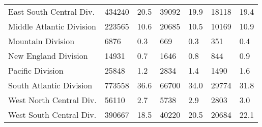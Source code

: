\begin{longtable}{lllllll}
East South Central Div. & 434240 & 20.5 & 39092 & 19.9 & 18118 & 19.4 \\ 
Middle Atlantic Division & 223565 & 10.6 & 20685 & 10.5 & 10169 & 10.9 \\ 
Mountain Division & 6876 & 0.3 & 669 & 0.3 & 351 & 0.4 \\ 
New England Division & 14931 & 0.7 & 1646 & 0.8 & 844 & 0.9 \\ 
Pacific Division & 25848 & 1.2 & 2834 & 1.4 & 1490 & 1.6 \\ 
South Atlantic Division & 773558 & 36.6 & 66700 & 34.0 & 29774 & 31.8 \\ 
West North Central Div. & 56110 & 2.7 & 5738 & 2.9 & 2803 & 3.0 \\ 
West South Central Div. & 390667 & 18.5 & 40220 & 20.5 & 20684 & 22.1 \\ 
 \bottomrule
\end{longtable}

